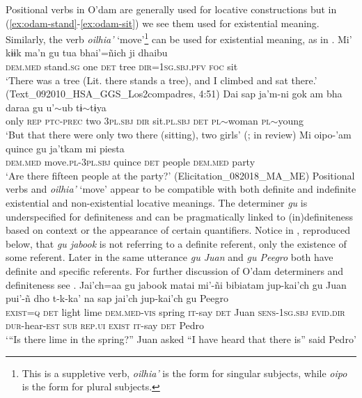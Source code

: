 \documentclass[output=paper]{langsci/langscibook}
\begin{document}
Positional verbs in O’dam are generally used for locative constructions \citep{garcia2017} but in (\ref{ex:odam-stand}-\ref{ex:odam-sit}) we see them used for existential meaning. Similarly, the verb \emph{oilhia’} ‘move’\footnote{This is a suppletive verb, \emph{oilhia’} is the form for singular subjects, while \emph{oipo} is the form for plural subjects.} can be used for existential meaning, as in .
\ea
\label{ex:odam-stand}
\gll Mi’	kɨɨk		ma’n 	gu 	tua 	bhai’=ñich		 ji 	dhaibu\\
\textsc{dem.med}	stand.\textsc{sg}	one 	\textsc{det} 	tree 	\textsc{dir=1sg.sbj.pfv} 	\textsc{foc} 	sit\\
\glt ‘There was a tree (Lit. there stands a tree), and I climbed and sat there.’ (Text\_092010\_HSA\_GGS\_Los2compadres, 4:51)
\z 
\ea
\label{ex:odam-sit}
\gll Dai	sap	ja'm-ni 		gok 	am 		bha 	daraa gu 	u'$\sim$ub        		tɨ$\sim$tɨya\\
only	\textsc{rep} 	\textsc{ptc-prec} 		two	3\textsc{pl.sbj} 	\textsc{dir} 	sit.\textsc{pl.sbj}  \textsc{det} 	\textsc{pl}$\sim$woman 	\textsc{pl}$\sim$young\\
\glt ‘But that there were only two there (sitting), two girls’ (\citeauthor{garciaeinrev}; in review)
\z 
\ea
\label{ex:odam-move}
\gll Mi 	oipo-’am 		quince gu	ja’tkam	mi 	piesta\\
	\textsc{dem.med}	move.\textsc{pl-3pl.sbj}	quince	\textsc{det}	people		\textsc{dem.med}	party\\
\glt ‘Are there fifteen people at the party?’ (Elicitation\_082018\_MA\_ME)
\z 
Positional verbs and \emph{oilhia’} ‘move’ appear to be 
compatible with both definite and indefinite existential and 
non-existential locative meanings. The determiner \emph{gu} is
underspecified for definiteness and can be pragmatically 
linked to (in)definiteness based on context or the appearance 
of certain quantifiers. Notice in , reproduced below, that \emph{gu 
jabook} is not referring to a definite referent, only the 
existence of some referent. Later in the same utterance 
\emph{gu Juan} and \emph{gu Peegro} both have definite and 
specific referents. For further discussion of O'dam 
determiners and definiteness see \citet[25-28]{everdell2018}.
\ea
\gll Jai’ch=aa	gu	jabook	matai	mi’-ñi		bibiatam jup-kai’ch	gu	Juan pui’-ñ			dho		t\stacktwo{/}{e}-k-ka’		na	sap		jai’ch jup-kai’ch	gu	Peegro\\
\textsc{exist=q}	\textsc{det}	light	lime	\textsc{dem.med-vis}	spring \textsc{it}-say		\textsc{det}	Juan \textsc{sens-1sg.sbj}	\textsc{evid.dir}	\textsc{dur}-hear-\textsc{est}	\textsc{sub}	\textsc{rep.ui}	\textsc{exist} \textsc{it}-say		\textsc{det}	Pedro\\
\glt ‘“Is there lime in the spring?” Juan asked “I have heard that there is” said Pedro’ \citep[76]{willettw2015}
\z 
\end{document}
